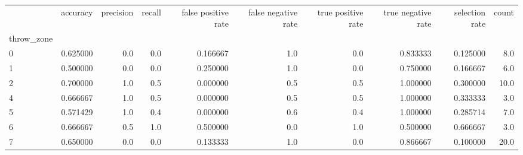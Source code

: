 \begin{tabular}{lrrrrrrrrr}
\toprule
{} &  accuracy &  precision &  recall &  false positive rate &  false negative rate &  true positive rate &  true negative rate &  selection rate &  count \\
throw\_zone &           &            &         &                      &                      &                     &                     &                 &        \\
\midrule
0          &  0.625000 &        0.0 &     0.0 &             0.166667 &                  1.0 &                 0.0 &            0.833333 &        0.125000 &    8.0 \\
1          &  0.500000 &        0.0 &     0.0 &             0.250000 &                  1.0 &                 0.0 &            0.750000 &        0.166667 &    6.0 \\
2          &  0.700000 &        1.0 &     0.5 &             0.000000 &                  0.5 &                 0.5 &            1.000000 &        0.300000 &   10.0 \\
4          &  0.666667 &        1.0 &     0.5 &             0.000000 &                  0.5 &                 0.5 &            1.000000 &        0.333333 &    3.0 \\
5          &  0.571429 &        1.0 &     0.4 &             0.000000 &                  0.6 &                 0.4 &            1.000000 &        0.285714 &    7.0 \\
6          &  0.666667 &        0.5 &     1.0 &             0.500000 &                  0.0 &                 1.0 &            0.500000 &        0.666667 &    3.0 \\
7          &  0.650000 &        0.0 &     0.0 &             0.133333 &                  1.0 &                 0.0 &            0.866667 &        0.100000 &   20.0 \\
\bottomrule
\end{tabular}

